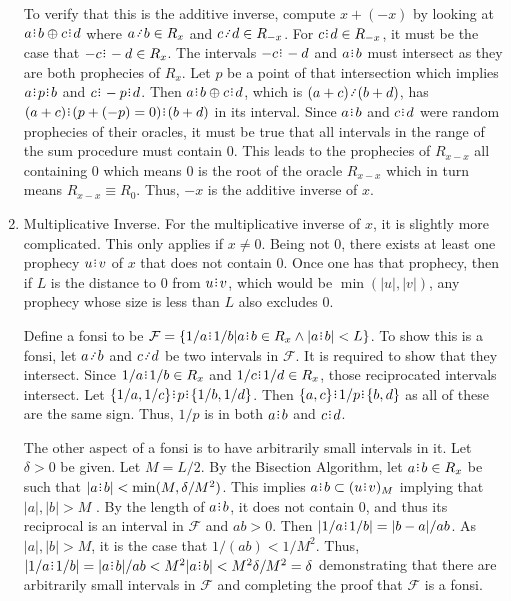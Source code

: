 \documentclass[12pt]{article}
\begin{document}
\begin{enumerate}
    To verify that this is the additive inverse, compute $x + (-x)$ by looking at $a\rint b \oplus c\rint d$ where $a \lte b \in R_x$ and $c \lte d \in R_{-x}$. For $c\rint d \in R_{-x}$, it must be the case that $-c\rint -d \in R_x$. The intervals $-c \rint  -d$ and $a\rint b$ must intersect as they are both prophecies of $R_x$. Let $p$ be a point of that intersection which implies $a\rint p\rint b$ and $c\rint -p\rint d$. Then $a\rint b \oplus c\rint d$, which is $(a+c) \lte (b+d)$, has $(a+c) \rint  ( p + (-p) =0 ) \rint  (b+d)$ in its interval. Since $a\rint b$ and $c\rint d$ were random prophecies of their oracles, it must be true that all intervals in the range of the sum procedure must contain 0. This leads to the prophecies of $R_{x-x}$ all containing 0 which means 0 is the root of the oracle $R_{x-x}$ which in turn means $R_{x-x} \equiv R_0$.  Thus, $-x$ is the additive inverse of $x$. 
    
    \item Multiplicative Inverse. For the multiplicative inverse of $x$, it is slightly more complicated. This only applies if $x \neq 0$. Being not 0, there exists at least one prophecy $u\rint v$ of $x$ that does not contain 0. Once one has that prophecy, then if $L$ is the distance to 0 from $u\rint v$, which would be $\min(|u|, |v|)$, any prophecy whose size is less than $L$ also excludes 0. 
    
    Define a fonsi to be $\mathcal{F} = \{1/a \rint  1/b | a\rint b \in R_x \wedge |a\rint b| < L \}$. To show this is a fonsi, let $a\lte b$ and $c \lte d$ be two intervals in $\mathcal{F}$. It is required to show that they intersect. Since $1/a\rint 1/b \in R_x$ and $1/c\rint 1/d \in R_x$, those reciprocated intervals intersect. Let $\{1/a, 1/c\} \rint  p \rint  \{1/b, 1/d\}$. Then $\{a, c\} \rint  1/p \rint  \{b, d\}$ as all of these are the same sign. Thus, $1/p$ is in both $a\rint b$ and $c\rint d$. 

    The other aspect of a fonsi is to have arbitrarily small intervals in it. Let $\delta > 0$ be given. Let $M = L/2$. By the Bisection Algorithm, let $a\rint b \in R_x$ be such that $|a\rint b| < \min(M, \delta/M^2)$. This implies $a\rint b \subset \halo[M]{u\rint v}$ implying that $|a|, |b| >  M$ . By the length of $a\rint b$, it does not contain 0, and thus its reciprocal is an interval in $\mathcal{F}$ and $ab > 0$. Then $|1/a\rint  1/b| = |b-a|/ab$. As $|a|, |b| > M$, it is the case that $1/(ab) < 1/M^2$. Thus, $|1/a\rint 1/b| = |a\rint b|/ab < M^2|a\rint b| < M^2 \delta/M^2 = \delta$ demonstrating that there are arbitrarily small intervals in $\mathcal{F}$ and completing the proof that $\mathcal{F}$ is a fonsi. 
    

\end{enumerate}
\end{document}
